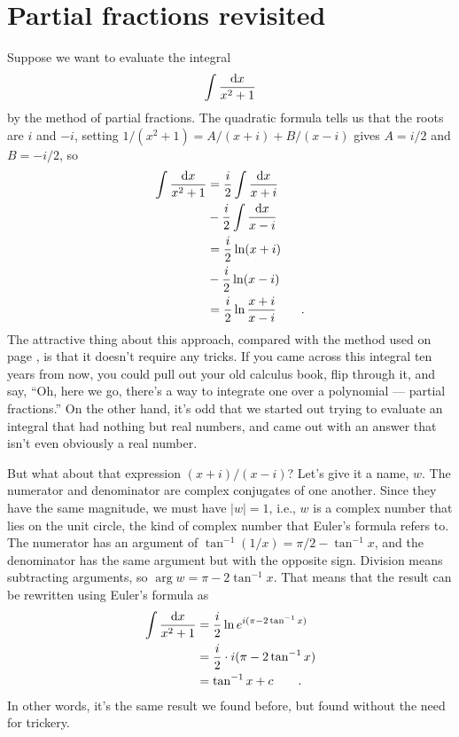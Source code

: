 \section{Partial fractions revisited}\label{sec:complex-part-frac}

Suppose we want to evaluate the integral
\begin{equation*}
  \int \frac{\textup{d} x}{x^2+1}
\end{equation*}
by the method of partial fractions. The quadratic formula tells us that the
roots are $i$ and $-i$, setting
$1/(x^2+1)=A/(x+i)+B/(x-i)$ gives $A=i/2$ and $B=-i/2$, so
\begin{align*}
  \int \frac{\textup{d} x}{x^2+1} &= \frac{i}{2} \int \frac{\textup{d} x}{x+i} \\
                            &  -\frac{i}{2}\int \frac{\textup{d} x}{x-i} \\
      &= \frac{i}{2}\ln(x+i)\\
        &-\frac{i}{2}\ln(x-i) \\
      &= \frac{i}{2}\ln\frac{x+i}{x-i} \qquad .
\end{align*}
The attractive thing about this approach, compared with the method
used on page \pageref{eg:arctan}, is that it doesn't require any
tricks. If you came across this integral ten years from now, you
could pull out your old calculus book, flip through it, and say,
``Oh, here we go, there's a way to integrate one over a polynomial ---
partial fractions.'' On the other hand, it's odd that we started out
trying to evaluate an integral that had nothing but real numbers,
and came out with an answer that isn't even obviously a real number.

But what about that expression $(x+i)/(x-i)$? Let's give it a name,
$w$. The numerator and denominator are complex conjugates of one
another. Since they have the same magnitude, we must have $|w|=1$,
i.e., $w$ is a complex number that lies on the unit circle, the
kind of complex number that Euler's formula refers to. The numerator
has an argument of $\tan^{-1}(1/x)=\pi/2-\tan^{-1}x$, and the denominator
has the same argument but with the opposite sign. Division means subtracting
arguments, so $\arg w=\pi-2\tan^{-1}x$. That means that the result can
be rewritten using Euler's formula as
\begin{align*}
  \int \frac{\textup{d} x}{x^2+1} &= \frac{i}{2}\ln e^{i(\pi-2\tan^{-1}x)} \\
      &=  \frac{i}{2}\cdot i(\pi-2\tan^{-1}x) \\
      &=  \tan^{-1}x + c \qquad .
\end{align*}
In other words, it's the same result we found before, but found 
without the need for trickery.

